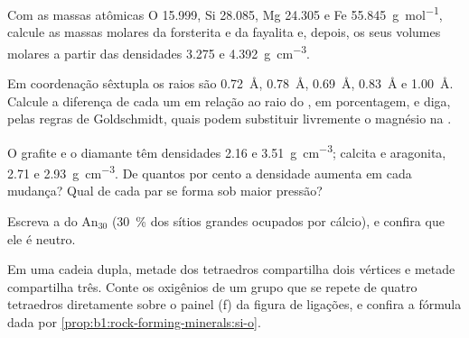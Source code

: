 \begin{exercise}[$\star$]\label{exo:b1:rock-forming-minerals:2}
Com as massas atômicas O \num{15.999}, Si \num{28.085}, Mg \num{24.305} e
Fe \qty{55.845}{g.mol^{-1}}, calcule as massas molares da forsterita e da
fayalita e, depois, os seus volumes molares a partir das densidades \num{3.275} e \qty{4.392}{g.cm^{-3}}.
\end{exercise}

\begin{exercise}[$\star$]\label{exo:b1:rock-forming-minerals:3}
Em coordenação sêxtupla os raios são  \qty{0.72}{\angstrom},
 \qty{0.78}{\angstrom},  \qty{0.69}{\angstrom},
 \qty{0.83}{\angstrom} e  \qty{1.00}{\angstrom}.
Calcule a diferença de cada um em relação ao raio do , em porcentagem, e diga, pelas regras de Goldschmidt, quais podem substituir livremente o magnésio na .
\end{exercise}

\begin{exercise}[$\star$]\label{exo:b1:rock-forming-minerals:4}
O grafite e o diamante têm densidades \num{2.16} e \qty{3.51}{g.cm^{-3}};
calcita e aragonita, \num{2.71} e \qty{2.93}{g.cm^{-3}}. De quantos por cento a densidade aumenta em cada mudança? Qual  de cada par se forma sob maior pressão?
\end{exercise}

\begin{exercise}[$\star\star$]\label{exo:b1:rock-forming-minerals:5}
Escreva a  do  $\text{An}_{30}$ (\qty{30}{\percent}
dos sítios grandes ocupados por cálcio), e confira que ele é neutro.
\end{exercise}

\begin{exercise}[$\star\star$]\label{exo:b1:rock-forming-minerals:6}
Em uma cadeia dupla, metade dos tetraedros compartilha dois vértices e metade compartilha três. Conte os oxigênios de um grupo que se repete de quatro tetraedros diretamente sobre o painel (f) da figura de ligações, e confira a fórmula  dada por
\cref{prop:b1:rock-forming-minerals:si-o}.
\end{exercise}

